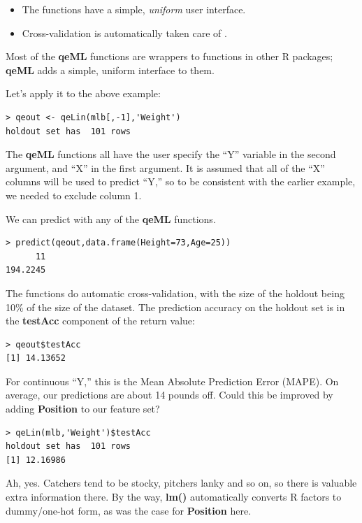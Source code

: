 \begin{itemize}

\item The functions have a simple, \textit{uniform} user interface.

\item Cross-validation is automatically taken care of .

\end{itemize} 

Most of the \textbf{qeML} functions are wrappers to functions in other R
packages; \textbf{qeML} adds a simple, uniform interface to them.

Let's apply it to the above example:

\begin{lstlisting}
> qeout <- qeLin(mlb[,-1],'Weight')
holdout set has  101 rows
\end{lstlisting}

The \textbf{qeML} functions all have the user specify the ``Y'' variable
in the second argument, and ``X'' in the first argument.  It is assumed
that all of the ``X'' columns will be used to predict ``Y,'' so to be
consistent with the earlier example, we needed to exclude column 1.

We can predict with any of the \textbf{qeML} functions.

\begin{lstlisting}
> predict(qeout,data.frame(Height=73,Age=25))
      11 
194.2245 
\end{lstlisting}

The functions do automatic cross-validation, with the size of the holdout
being 10\% of the size of the dataset.  The prediction accuracy on the
holdout set is in the \textbf{testAcc} component of the return value:

\begin{lstlisting}
> qeout$testAcc
[1] 14.13652
\end{lstlisting}

For continuous ``Y,'' this is the Mean Absolute Prediction Error
(MAPE).  On average, our predictions are about 14 pounds off.
Could this be improved by adding \textbf{Position} to our feature set?

\begin{lstlisting}
> qeLin(mlb,'Weight')$testAcc
holdout set has  101 rows
[1] 12.16986
\end{lstlisting}

Ah, yes.  Catchers tend to be stocky, pitchers lanky and so on, so there
is valuable extra information there.  By the way, \textbf{lm()}
automatically converts R factors to dummy/one-hot form, as was the case
for \textbf{Position} here.


